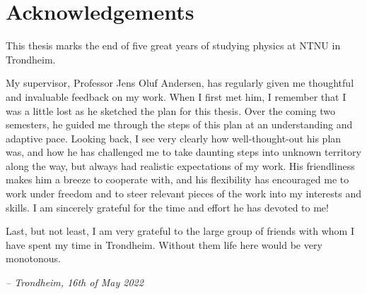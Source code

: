 \mbox{}\vfill
\begin{center}
\end{center}

\chapter*{Acknowledgements}

This thesis marks the end of five great years of studying physics at NTNU in Trondheim.

My supervisor, Professor Jens Oluf Andersen,
has regularly given me thoughtful and invaluable feedback on my work.
When I first met him,
I remember that I was a little lost as he sketched the plan for this thesis.
Over the coming two semesters, he guided me through the steps of this plan at an understanding and adaptive pace.
Looking back, I see very clearly how well-thought-out his plan was,
and how he has challenged me to take daunting steps into unknown territory along the way,
but always had realistic expectations of my work.
His friendliness makes him a breeze to cooperate with,
and his flexibility has encouraged me to work under freedom and to steer relevant pieces of the work into my interests and skills.
I am sincerely grateful for the time and effort he has devoted to me!

Last, but not least, I am very grateful to the large group of friends with whom I have spent my time in Trondheim.
Without them life here would be very monotonous.

\null\hfill \textit{-- Trondheim, 16th of May 2022}
